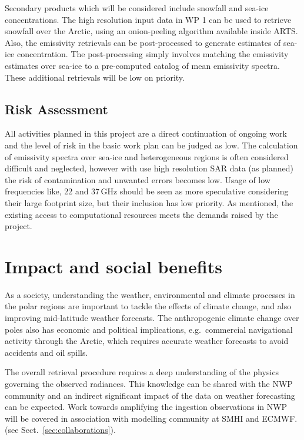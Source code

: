 \documentclass[12pt,oneside,a4paper]{article}
\begin{document}
Secondary products which will be considered include snowfall and sea-ice concentrations. The high resolution input data in WP 1 can be used to retrieve snowfall over the Arctic, using an onion-peeling algorithm available inside ARTS. Also, the emissivity retrievals can be post-processed to generate estimates of sea-ice concentration. The post-processing simply involves matching the emissivity estimates over sea-ice to a pre-computed catalog of mean emissivity spectra. These additional retrievals will be low on priority.



 
\subsection{Risk Assessment}
%
\label{sec:risk}
All activities planned in this project are a direct continuation of ongoing
work and the level of risk in the basic work plan can be judged as low. The
calculation of emissivity spectra over sea-ice and heterogeneous regions is
often considered difficult and neglected, however with use high resolution SAR
data (as planned) the risk of contamination and unwanted errors becomes low.
Usage of low frequencies like, 22 and 37\,GHz should be seen as more
speculative considering their large footprint size, but their inclusion has
low priority. As mentioned, the existing access to computational resources
meets the demands raised by the project.


\section{Impact and social benefits}
%
\label{sec:impact}

As a society, understanding the weather, environmental and
climate processes in the polar regions are important to tackle the effects
of climate change, and also improving mid-latitude weather forecasts. The
anthropogenic climate change over poles also has economic and political
implications, e.g.\ commercial navigational activity through the Arctic, which
requires accurate weather forecasts to avoid accidents and oil spills.

The overall retrieval procedure requires a deep understanding of the physics
governing the observed radiances. This knowledge can be shared with the NWP community and an indirect significant impact of the data on weather forecasting can be expected. Work towards amplifying the ingestion observations in NWP will be covered in association with modelling community at SMHI and ECMWF. (see
Sect.~\ref{sec:collaborations}).
\end{document}
